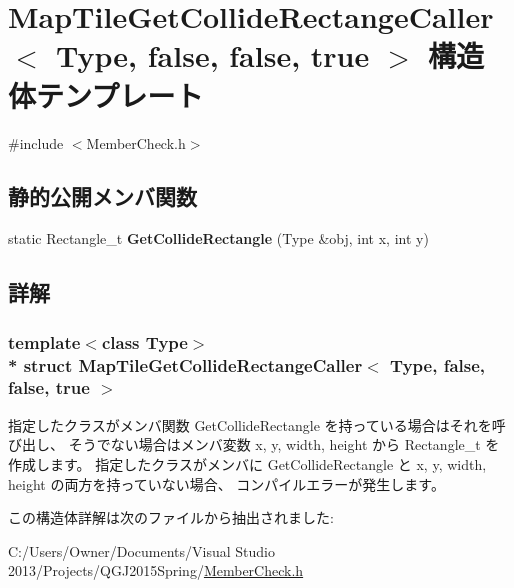 \hypertarget{struct_map_tile_get_collide_rectange_caller_3_01_type_00_01false_00_01false_00_01true_01_4}{}\section{Map\+Tile\+Get\+Collide\+Rectange\+Caller$<$ Type, false, false, true $>$ 構造体テンプレート}
\label{struct_map_tile_get_collide_rectange_caller_3_01_type_00_01false_00_01false_00_01true_01_4}


 




{\ttfamily \#include $<$Member\+Check.\+h$>$}

\subsection*{静的公開メンバ関数}
\begin{DoxyCompactItemize}
\item 
static Rectangle\+\_\+t {\bfseries Get\+Collide\+Rectangle} (Type \&obj, int x, int y)\hypertarget{struct_map_tile_get_collide_rectange_caller_3_01_type_00_01false_00_01false_00_01true_01_4_a83898b741cfcd5912c09ed4f0e96acf6}{}\label{struct_map_tile_get_collide_rectange_caller_3_01_type_00_01false_00_01false_00_01true_01_4_a83898b741cfcd5912c09ed4f0e96acf6}

\end{DoxyCompactItemize}


\subsection{詳解}
\subsubsection*{template$<$class Type$>$\\*
struct Map\+Tile\+Get\+Collide\+Rectange\+Caller$<$ Type, false, false, true $>$}



指定したクラスがメンバ関数 Get\+Collide\+Rectangle を持っている場合はそれを呼び出し、 そうでない場合はメンバ変数 x, y, width, height から Rectangle\+\_\+t を作成します。 指定したクラスがメンバに Get\+Collide\+Rectangle と x, y, width, height の両方を持っていない場合、 コンパイルエラーが発生します。 

この構造体詳解は次のファイルから抽出されました\+:\begin{DoxyCompactItemize}
\item 
C\+:/\+Users/\+Owner/\+Documents/\+Visual Studio 2013/\+Projects/\+Q\+G\+J2015\+Spring/\hyperlink{_member_check_8h}{Member\+Check.\+h}\end{DoxyCompactItemize}
